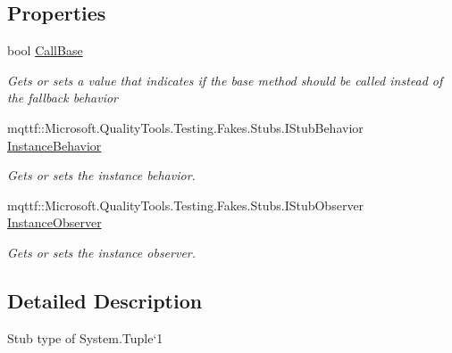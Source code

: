 \subsection*{Properties}
\begin{DoxyCompactItemize}
\item 
bool \hyperlink{class_system_1_1_fakes_1_1_stub_tuple_3_01_t1_01_4_a6d16df72e07a4a99511bd163e73c6a40}{Call\-Base}
\begin{DoxyCompactList}\small\item\em Gets or sets a value that indicates if the base method should be called instead of the fallback behavior\end{DoxyCompactList}\item 
mqttf\-::\-Microsoft.\-Quality\-Tools.\-Testing.\-Fakes.\-Stubs.\-I\-Stub\-Behavior \hyperlink{class_system_1_1_fakes_1_1_stub_tuple_3_01_t1_01_4_aa88e7bc9352a9e6ca596d243e0070176}{Instance\-Behavior}
\begin{DoxyCompactList}\small\item\em Gets or sets the instance behavior.\end{DoxyCompactList}\item 
mqttf\-::\-Microsoft.\-Quality\-Tools.\-Testing.\-Fakes.\-Stubs.\-I\-Stub\-Observer \hyperlink{class_system_1_1_fakes_1_1_stub_tuple_3_01_t1_01_4_a28473ce3c8608ee6eff11e48c333b9aa}{Instance\-Observer}
\begin{DoxyCompactList}\small\item\em Gets or sets the instance observer.\end{DoxyCompactList}\end{DoxyCompactItemize}


\subsection{Detailed Description}
Stub type of System.\-Tuple`1



